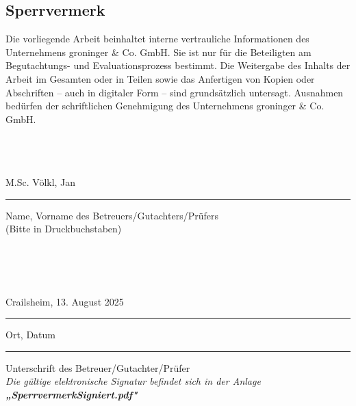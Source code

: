 \newpage
\setcounter{page}{2}

\newpage
\setcounter{page}{2}

% 

% 

\subsection*{Sperrvermerk}
Die vorliegende Arbeit beinhaltet interne vertrauliche Informationen des Unternehmens groninger \& Co. GmbH. Sie ist nur für die Beteiligten am Begutachtungs- und Evaluationsprozess bestimmt. Die Weitergabe des Inhalts der Arbeit im Gesamten oder in Teilen sowie das Anfertigen von Kopien oder Abschriften – auch in digitaler Form – sind grundsätzlich untersagt. Ausnahmen bedürfen der schriftlichen Genehmigung des Unternehmens groninger \& Co. GmbH. \\ \\ \\ \\

\hspace{2cm}
\parbox{9cm}{\centering M.Sc. Völkl, Jan \hrule
\strut \centering\footnotesize Name, Vorname des Betreuers/Gutachters/Prüfers \\ (Bitte in Druckbuchstaben)} \\ \\ \\

\parbox[t][][t]{5cm}{\centering Crailsheim, 13. August 2025 \hrule \strut \centering \footnotesize Ort, Datum} %
\hspace{3cm}
\parbox[t][][t]{5cm}{\vspace{0.09cm} \hrule \strut \centering \footnotesize Unterschrift des Betreuer/Gutachter/Prüfer \\[0.8em]
  \footnotesize\itshape Die gültige elektronische Signatur befindet sich in der Anlage\\[0.3em]
  {{\color{red}\textbf{„SperrvermerkSigniert.pdf"}}}
}